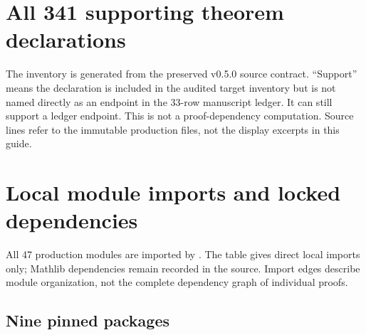 \section{All 341 supporting theorem declarations}
\label{sec:catalog}
The inventory is generated from the preserved v0.5.0 source contract. ``Support'' means the declaration is included in the audited target inventory but is not named directly as an endpoint in the 33-row manuscript ledger. It can still support a ledger endpoint. This is not a proof-dependency computation. Source lines refer to the immutable production files, not the display excerpts in this guide.

\clearpage
\section{Local module imports and locked dependencies}
\label{sec:imports}
All 47 production modules are imported by . The table gives direct local imports only; Mathlib dependencies remain recorded in the source. Import edges describe module organization, not the complete dependency graph of individual proofs.

\subsection{Nine pinned packages}



